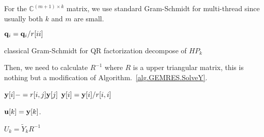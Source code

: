 For the $\mathbb{C}^{(m+1)\times k}$ matrix, we use standard Gram-Schmidt for multi-thread since usually both $k$ and $m$ are small.
\begin{algorithm}[H]
\begin{algorithmic}
    \EndFor
        \EndFor    
    \EndIf
\EndFor
{}
    \State ${\bf q}_i={\bf q}_i/r[ii]$
\EndFor

\end{algorithmic}
\caption{classical Gram-Schmidt for QR factorization decompose of $HP_k$}
\end{algorithm}

Then, we need to calculate $R^{-1}$ where $R$ is a upper triangular matrix, this is nothing but a modification of Algorithm.~\ref{alg.GEMRES.SolveY}.
\begin{algorithm}[H]
\begin{algorithmic}
        \State ${\bf y}[i]-=r[i,j] {\bf y}[j]$
    \EndFor
    \State ${\bf y}[i] = {\bf y}[i] / r[i,i]$
\EndFor

\Return ${\bf u}[k]={\bf y}[k]$.
\end{algorithmic}
\caption{$U_k=\tilde{Y}_k R^{-1}$}
\end{algorithm}
